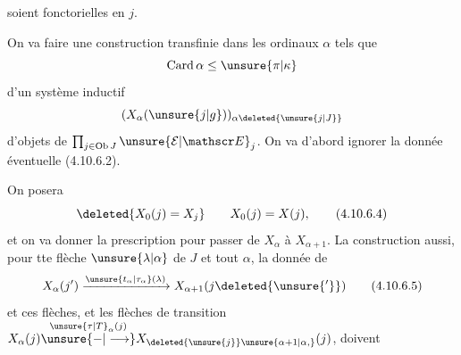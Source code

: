 soient fonctorielles en $j$.

On va faire une construction transfinie dans les ordinaux $\alpha$ tels que
\[
 \operatorname{Card}\alpha\leq\unsure{\pi|\kappa}
\]
d'un système inductif
\[
 (X_{\alpha}(\unsure{j|g}))_{\alpha\deleted{\unsure{j|J}}}
\]
d'objets de $\prod_{j\in\operatorname{Ob}J}\unsure{\mathcal E|\mathscr E}_j$. On va d'abord ignorer la donnée éventuelle (4.10.6.2).

On posera
\[
 \deleted{X_0(j)=X_j}\qquad X_0(j)=X(j), \tag*{(4.10.6.4)}
\]
et on va donner la prescription pour passer de $X_{\alpha}$ à $X_{\alpha+1}$. La construction   aussi, pour tte flèche $\unsure{\lambda|\alpha}$  de $J$ et tout $\alpha$, la donnée de
\[
 X_{\alpha}(j')\xrightarrow{\unsure{t_{\alpha}|\tau_{\alpha}}(\lambda)}X_{\alpha+1}(j\deleted{\unsure{'}}) \tag*{(4.10.6.5)}
\]
et ces flèches, et les flèches de transition $X_{\alpha}(j)\overset{\unsure{\tau|T}_{\alpha}(j)}{\unsure{\mathbin{-}|\longrightarrow}} X_{\deleted{\unsure{j}}\unsure{\alpha+1|\alpha,}}(j)$, doivent
